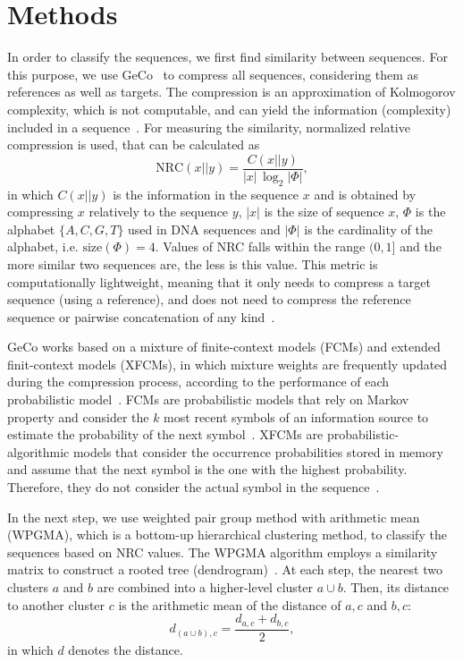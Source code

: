 \documentclass[extendedabs]{recpad2k}
\begin{document}
\section{Methods}
In order to classify the sequences, we first find similarity between sequences. For this purpose, we use GeCo~\cite{pratas2016efficient} to compress all sequences, considering them as references as well as targets. The compression is an approximation of Kolmogorov complexity, which is not computable, and can yield the information (complexity) included in a sequence~\cite{kolmogorov1965three}. For measuring the similarity, normalized relative compression is used, that can be calculated as~\cite{pratas2018comparison}
\begin{equation}
   \mathrm{NRC} (x||y) = \frac{C (x||y)}{|x|\, \log_2 |\Phi|},
\end{equation}
in which $C (x||y)$ is the information in the sequence $x$ and is obtained by compressing $x$ relatively to the sequence $y$, $|x|$ is the size of sequence $x$, $\Phi$ is the alphabet $\{A, C, G, T\}$ used in DNA sequences and $|\Phi|$ is the cardinality of the alphabet, i.e. $ \mathrm{size}(\Phi) = 4 $. Values of NRC falls within the range $(0, 1]$ and the more similar two sequences are, the less is this value. This metric is computationally lightweight, meaning that it only needs to compress a target sequence (using a reference), and does not need to compress the reference sequence or pairwise concatenation of any kind~\cite{pratas2018comparison}.

GeCo works based on a mixture of finite-context models (FCMs) and extended finit-context models (XFCMs), in which mixture weights are frequently updated during the compression process, according to the performance of each probabilistic model~\cite{pratas2016efficient}. FCMs are probabilistic models that rely on Markov property and consider the $k$ most recent symbols of an information source to estimate the probability of the next symbol~\cite{hosseini2019ac}. XFCMs are probabilistic-algorithmic models that consider the occurrence probabilities stored in memory and assume that the next symbol is the one with the highest probability. Therefore, they do not consider the actual symbol in the sequence~\cite{pratas2017substitutional}.  

In the next step, we use weighted pair group method with arithmetic mean (WPGMA), which is a bottom-up hierarchical clustering method, to classify the sequences based on NRC values. The WPGMA algorithm employs a similarity matrix to construct a rooted tree (dendrogram)~\cite{sokal58a, clifford2011comparison}. At each step, the nearest two clusters $a$ and $b$ are combined into a higher-level cluster $a\cup b$. Then, its distance to another cluster $c$ is the arithmetic mean of the distance of $a, c$ and $b, c$:
\begin{equation}
   d_{(a\cup b), c} = \frac{d_{a, c} + d_{b, c}}{2},
\end{equation}
in which $d$ denotes the distance.
\end{document}

